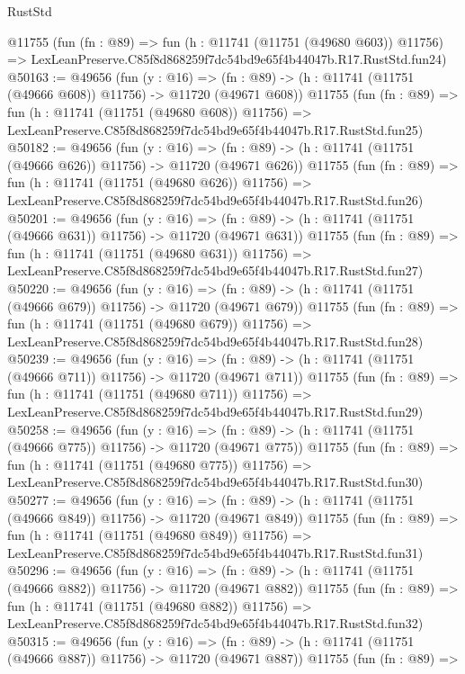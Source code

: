 \begin{lexlean}{RustStd}
\begin{coremodule}
    @11755
    (fun (fn : @89) =>
    fun (h : @11741 (@11751 (@49680 @603)) @11756) =>
    LexLeanPreserve.C85f8d868259f7dc54bd9e65f4b44047b.R17.RustStd.fun24)
@50163 := @49656
    (fun (y : @16) =>
    (fn : @89) -> (h : @11741 (@11751 (@49666 @608)) @11756) -> @11720 (@49671 @608))
    @11755
    (fun (fn : @89) =>
    fun (h : @11741 (@11751 (@49680 @608)) @11756) =>
    LexLeanPreserve.C85f8d868259f7dc54bd9e65f4b44047b.R17.RustStd.fun25)
@50182 := @49656
    (fun (y : @16) =>
    (fn : @89) -> (h : @11741 (@11751 (@49666 @626)) @11756) -> @11720 (@49671 @626))
    @11755
    (fun (fn : @89) =>
    fun (h : @11741 (@11751 (@49680 @626)) @11756) =>
    LexLeanPreserve.C85f8d868259f7dc54bd9e65f4b44047b.R17.RustStd.fun26)
@50201 := @49656
    (fun (y : @16) =>
    (fn : @89) -> (h : @11741 (@11751 (@49666 @631)) @11756) -> @11720 (@49671 @631))
    @11755
    (fun (fn : @89) =>
    fun (h : @11741 (@11751 (@49680 @631)) @11756) =>
    LexLeanPreserve.C85f8d868259f7dc54bd9e65f4b44047b.R17.RustStd.fun27)
@50220 := @49656
    (fun (y : @16) =>
    (fn : @89) -> (h : @11741 (@11751 (@49666 @679)) @11756) -> @11720 (@49671 @679))
    @11755
    (fun (fn : @89) =>
    fun (h : @11741 (@11751 (@49680 @679)) @11756) =>
    LexLeanPreserve.C85f8d868259f7dc54bd9e65f4b44047b.R17.RustStd.fun28)
@50239 := @49656
    (fun (y : @16) =>
    (fn : @89) -> (h : @11741 (@11751 (@49666 @711)) @11756) -> @11720 (@49671 @711))
    @11755
    (fun (fn : @89) =>
    fun (h : @11741 (@11751 (@49680 @711)) @11756) =>
    LexLeanPreserve.C85f8d868259f7dc54bd9e65f4b44047b.R17.RustStd.fun29)
@50258 := @49656
    (fun (y : @16) =>
    (fn : @89) -> (h : @11741 (@11751 (@49666 @775)) @11756) -> @11720 (@49671 @775))
    @11755
    (fun (fn : @89) =>
    fun (h : @11741 (@11751 (@49680 @775)) @11756) =>
    LexLeanPreserve.C85f8d868259f7dc54bd9e65f4b44047b.R17.RustStd.fun30)
@50277 := @49656
    (fun (y : @16) =>
    (fn : @89) -> (h : @11741 (@11751 (@49666 @849)) @11756) -> @11720 (@49671 @849))
    @11755
    (fun (fn : @89) =>
    fun (h : @11741 (@11751 (@49680 @849)) @11756) =>
    LexLeanPreserve.C85f8d868259f7dc54bd9e65f4b44047b.R17.RustStd.fun31)
@50296 := @49656
    (fun (y : @16) =>
    (fn : @89) -> (h : @11741 (@11751 (@49666 @882)) @11756) -> @11720 (@49671 @882))
    @11755
    (fun (fn : @89) =>
    fun (h : @11741 (@11751 (@49680 @882)) @11756) =>
    LexLeanPreserve.C85f8d868259f7dc54bd9e65f4b44047b.R17.RustStd.fun32)
@50315 := @49656
    (fun (y : @16) =>
    (fn : @89) -> (h : @11741 (@11751 (@49666 @887)) @11756) -> @11720 (@49671 @887))
    @11755
    (fun (fn : @89) =>

\end{coremodule}
\end{lexlean}
